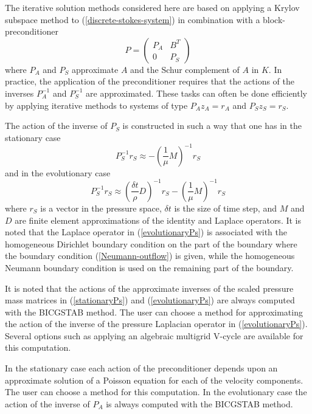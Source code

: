 \begin{versiona}
The iterative solution methods considered here are based on applying a
Krylov subspace method to (\ref{discrete-stokes-system}) 
in combination with a block-preconditioner
\begin{equation}
P= \left( \begin{array}{cc} P_A           & B^T \\
                         0    & P_S   \end{array}\right)  
\end{equation}
where $P_A$ and $P_S$ 
approximate $A$ and the Schur complement of $A$ in $K$.  
In practice, the application of the preconditioner requires that the actions of the inverses 
$P_A^{-1}$ and $P_S^{-1}$ are approximated. 
These tasks can often be done efficiently by applying iterative methods to systems
of type $P_Az_A=r_A$ and $P_Sz_S=r_S$.

The action of the inverse of $P_S$ is constructed in such a way that one has 
in the stationary case \cite{Si94} 
\begin{equation}\label{stationaryPs}
P_S^{-1}r_S \approx -(\frac{1}{\mu}M)^{-1}r_S   
\end{equation}
and in the evolutionary case \cite{Ca88}
\begin{equation}\label{evolutionaryPs}
P_S^{-1}r_S \approx (\frac{\delta t}{\rho}D)^{-1}r_S - (\frac{1}{\mu}M)^{-1}r_S    
\end{equation}
where $r_S$ is a vector in the pressure space, $\delta t$ is the size of time step, and 
$M$ and $D$ are finite element approximations of the identity 
and Laplace operators. It is noted that the Laplace operator in (\ref{evolutionaryPs})
is associated with the homogeneous Dirichlet boundary condition on the part of the boundary
where the boundary condition (\ref{Neumann-outflow}) is given,
while the homogeneous Neumann boundary condition is used on the remaining part
of the boundary.

It is noted that 
the actions of the approximate inverses of the scaled pressure mass matrices in 
(\ref{stationaryPs}) and (\ref{evolutionaryPs}) are always computed 
with the BICGSTAB method. The user can choose a method for 
approximating the action of the inverse of the pressure Laplacian operator in (\ref{evolutionaryPs}).
Several options such as applying an algebraic multigrid V-cycle are available for this computation. 

In the stationary case each action of the preconditioner
depends upon an approximate solution of a Poisson equation for each of the velocity components.
The user can choose a method for this computation.  
In the evolutionary case the action of the inverse of $P_A$ 
is always computed with the BICGSTAB method. 


\end{versiona}
